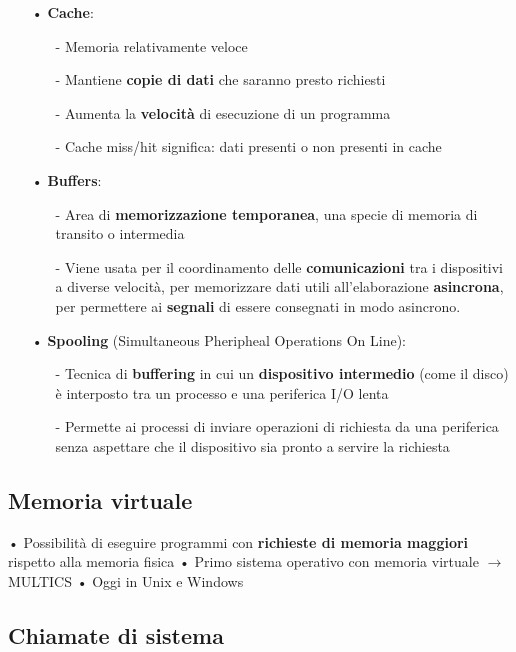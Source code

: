 \documentclass[12pt, letterpaper]{article}
\begin{document}
\begin{itemize}
   \item[•] \textbf{Cache}:
      \begin{itemize}
         \item[-] Memoria relativamente veloce 
         \item[-] Mantiene \textbf{copie di dati} che saranno presto richiesti 
         \item[-] Aumenta la \textbf{velocità} di esecuzione di un programma 
         \item[-] Cache miss/hit significa: dati presenti o non presenti in cache 
      \end{itemize}
   \item[•] \textbf{Buffers}:
      \begin{itemize}
         \item[-] Area di \textbf{memorizzazione temporanea}, una specie di memoria di transito o intermedia
         \item[-] Viene usata per il coordinamento delle \textbf{comunicazioni} tra i dispositivi a diverse velocità, per memorizzare dati utili all'elaborazione \textbf{asincrona},
            per permettere ai \textbf{segnali} di essere consegnati in modo asincrono.
      \end{itemize}
   \item[•] \textbf{Spooling} (Simultaneous Pheripheal Operations On Line):
      \begin{itemize}
         \item[-] Tecnica di \textbf{buffering} in cui un \textbf{dispositivo intermedio} (come il disco) è interposto tra un processo e una periferica I/O lenta
         \item[-] Permette ai processi di inviare operazioni di richiesta da una periferica senza aspettare che il dispositivo sia pronto a servire la richiesta
      \end{itemize}
\end{itemize}

\subsection{Memoria virtuale}

• Possibilità di eseguire programmi con \textbf{richieste di memoria maggiori} rispetto alla memoria fisica 
• Primo sistema operativo con memoria virtuale $\rightarrow$ MULTICS 
• Oggi in Unix e Windows 

\subsection{Chiamate di sistema}
\end{document}
